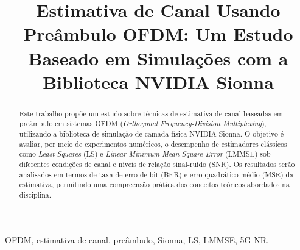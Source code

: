 \documentclass[conference]{IEEEtran}
\begin{document}
\title{Estimativa de Canal Usando Preâmbulo OFDM: Um Estudo Baseado em Simulações com a Biblioteca NVIDIA Sionna}

\author{
    \and
    \and
}


\maketitle

\begin{abstract}
Este trabalho propõe um estudo sobre técnicas de estimativa de canal baseadas em preâmbulo em sistemas OFDM (\textit{Orthogonal Frequency-Division Multiplexing}), utilizando a biblioteca de simulação de camada física NVIDIA Sionna. O objetivo é avaliar, por meio de experimentos numéricos, o desempenho de estimadores clássicos como \textit{Least Squares} (LS) e \textit{Linear Minimum Mean Square Error} (LMMSE) sob diferentes condições de canal e níveis de relação sinal-ruído (SNR). Os resultados serão analisados em termos de taxa de erro de bit (BER) e erro quadrático médio (MSE) da estimativa, permitindo uma compreensão prática dos conceitos teóricos abordados na disciplina.
\end{abstract}

\begin{IEEEkeywords}
OFDM, estimativa de canal, preâmbulo, Sionna, LS, LMMSE, 5G NR.
\end{IEEEkeywords}
\end{document}
